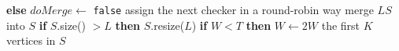 \begin{algorithm}[h]
{{{{                \textbf{else} $doMerge \gets$ \texttt{false}\; \label{minjia_algo_line:aup_end}
                assign the next checker in a round-robin way\;
            }
       } \label{minjia_algo_line:stale_substate_end}
    }
    merge $LS$ into $S$\; \label{minjia_algo_line:stale_merge}
    \textbf{if} $S$.size() $> L$ \textbf{then} $S$.resize($L$)\;
    \textbf{if} $W < T$ \textbf{then} $W \gets 2W$\;
} \label{minjia_algo_line:stale_global_step_end}
\Return the first $K$ vertices in $S$\;




\end{algorithm}

